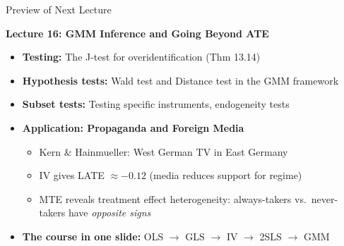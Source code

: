 \documentclass[aspectratio=169, handout, t]{beamer}
\numberwithin{equation}{section}
\begin{document}
\begin{frame}{Preview of Next Lecture}

\textbf{Lecture 16: GMM Inference and Going Beyond ATE}

\medskip
\begin{itemize}
\item \textbf{Testing:} The J-test for overidentification (Thm 13.14)
\item \textbf{Hypothesis tests:} Wald test and Distance test in the GMM framework
\item \textbf{Subset tests:} Testing specific instruments, endogeneity tests
\item \textbf{Application: Propaganda and Foreign Media}
\begin{itemize}
\item Kern \& Hainmueller: West German TV in East Germany
\item IV gives LATE $\approx -0.12$ (media reduces support for regime)
\item MTE reveals \alert{treatment effect heterogeneity}: always-takers vs.\ never-takers have \textit{opposite signs}
\end{itemize}
\item \textbf{The course in one slide:} OLS $\to$ GLS $\to$ IV $\to$ 2SLS $\to$ GMM
\end{itemize}

\end{frame}
\end{document}
